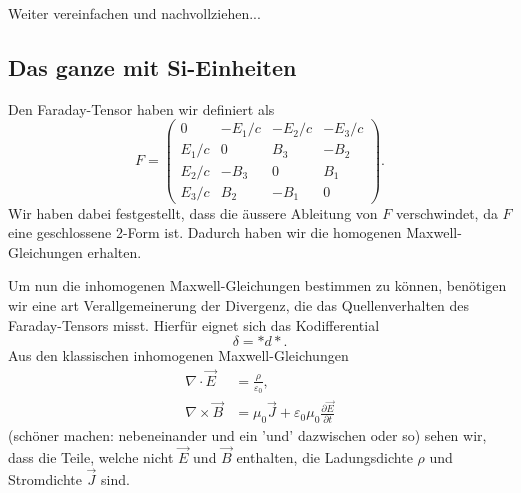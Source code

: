 Weiter vereinfachen und nachvollziehen...

\subsection{Das ganze mit Si-Einheiten}
Den Faraday-Tensor haben wir definiert als
\begin{equation}
	F = \begin{pmatrix}
		0 & -E_1/c & -E_2/c & -E_3/c \\ E_1/c & 0 & B_3 & -B_2 \\ E_2/c & -B_3 & 0 & B_1 \\ E_3/c & B_2 & -B_1 & 0 
	\end{pmatrix}.
\end{equation}
Wir haben dabei festgestellt, dass die äussere Ableitung von $F$ verschwindet, da $F$ eine geschlossene 2-Form ist. Dadurch haben wir die homogenen Maxwell-Gleichungen erhalten. 

Um nun die inhomogenen Maxwell-Gleichungen bestimmen zu können, benötigen wir eine art Verallgemeinerung der Divergenz, die das Quellenverhalten des Faraday-Tensors misst. Hierfür eignet sich das Kodifferential
\begin{equation*}
	\delta = \ast d \ast.
\end{equation*}
Aus den klassischen inhomogenen Maxwell-Gleichungen
\begin{align}
	\nabla \cdot \vec{E} &= \frac{\rho}{\varepsilon_0},\\
	\nabla \times \vec{B} &= \mu_0 \vec{J} + \varepsilon_0 \mu_0 \frac{\partial \vec{E}}{\partial t}
\end{align}
(schöner machen: nebeneinander und ein 'und' dazwischen oder so)
sehen wir, dass die Teile, welche nicht $\vec{E}$ und $\vec{B}$ enthalten, die Ladungsdichte $\rho$ und Stromdichte $\vec{J}$ sind.

